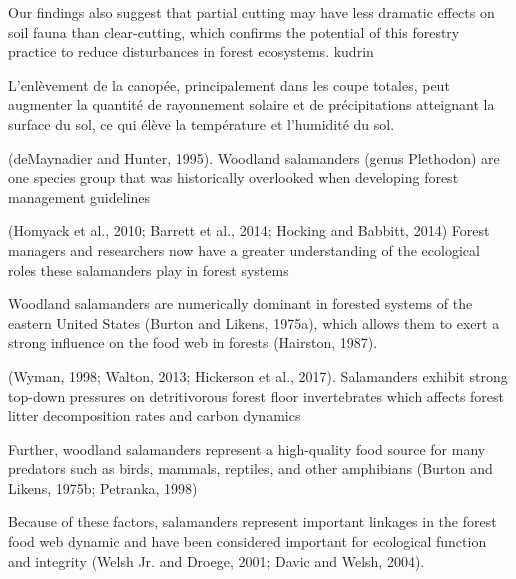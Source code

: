Our findings also suggest that partial cutting may have less dramatic effects on soil fauna than clear-cutting, which confirms the potential of this forestry practice to reduce disturbances in forest ecosystems. kudrin


L'enlèvement de la canopée, principalement dans les coupe totales, peut augmenter la quantité de rayonnement solaire et de précipitations atteignant la surface du sol, ce qui élève la température et l'humidité du sol.

(deMaynadier and Hunter, 1995). Woodland salamanders (genus Plethodon) are one species group that was historically overlooked when developing forest management guidelines 


(Homyack et al., 2010; Barrett et al., 2014; Hocking and Babbitt, 2014) Forest managers and researchers now have a greater understanding of the ecological roles these salamanders play in forest systems 

Woodland salamanders are numerically dominant in forested systems of the eastern United States (Burton and Likens, 1975a), which allows them to exert a strong influence on the food web in forests (Hairston, 1987).

(Wyman, 1998; Walton, 2013; Hickerson et al., 2017). Salamanders exhibit strong top-down pressures on detritivorous forest floor invertebrates which affects forest litter decomposition rates and carbon dynamics 

Further, woodland salamanders represent a high-quality food source for many predators such as birds, mammals, reptiles, and other amphibians (Burton and Likens, 1975b; Petranka, 1998)

Because of these factors, salamanders represent important linkages in the forest food web dynamic and have been considered important for ecological function and integrity (Welsh Jr. and Droege, 2001; Davic and Welsh, 2004).

